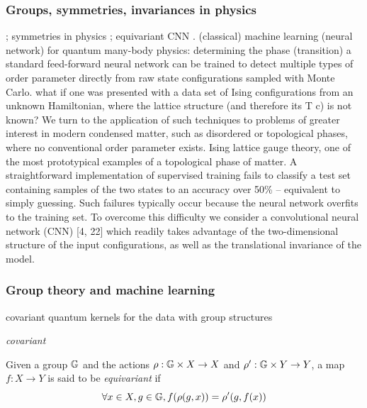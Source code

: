 \subsubsection{Groups, symmetries, invariances in physics}
\cite{kondorGroupTheoreticalMethods2008};
symmetries in physics
\cite{bogatskiyLorentzGroupEquivariant2020}
\cite{bogatskiySymmetryGroupEquivariant2022};
equivariant CNN 
\cite{zhengSpeedingLearningQuantum2022}.
(classical) machine learning (neural network) for quantum many-body physics:
determining the phase (transition) 
a standard feed-forward neural network can be trained to detect multiple types of order parameter directly from raw state conﬁgurations sampled with Monte Carlo.
what if one was presented with a data set of Ising conﬁgurations from an unknown Hamiltonian, where the lattice structure (and therefore its T c) is not known?
We turn to the application of such techniques to problems of greater interest in modern condensed matter, such as disordered or topological phases, where no conventional order parameter exists.
Ising lattice gauge theory, one of the most prototypical examples of a topological phase of matter.
A straightforward implementation of supervised training fails to classify a test set containing samples of the two states to an accuracy over 50\% – equivalent to simply guessing. Such failures typically occur because the neural network overﬁts to the training set. To overcome this diﬃculty we consider a convolutional neural network (CNN) [4, 22] which readily takes advantage of the two-dimensional structure of the input conﬁgurations, as well as the translational invariance of the model.
\cite{carrasquillaMachineLearningPhases2017}
\cite{carleoSolvingQuantumManyBody2017}

\subsubsection{Group theory and machine learning}
covariant quantum kernels for the data with group structures
\cite{glickCovariantQuantumKernels2021}
\begin{definition}[Covariant]\label{def:covariant}
	\emph{covariant}
\end{definition}
\begin{definition}[Equivariance]\label{def:equivariant}
	Given a group $\mathbb{G}$ and the actions $\rho: \mathbb{G} \times X\to X$ and $\rho': \mathbb{G} \times Y\to Y$,
	a map $f: X\to Y$ is said to be \emph{equivariant} if
	\begin{equation}
		\forall x\in X, g\in \mathbb{G},
		f(\rho(g,x)) = \rho'(g,f(x))
	\end{equation}
\end{definition}

